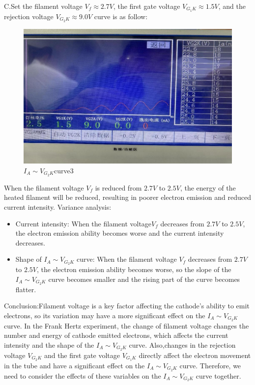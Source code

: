 \documentclass[UTF8]{article}
\begin{document}
C.Set the filament voltage $V_f\approx 2.7V$, the first gate voltage $V_{G_1K}\approx 1.5V$, and the rejection voltage $V_{G_2K}\approx 9.0V$ curve is as follow:
\begin{figure}[H]
            	\centering
            	\includegraphics[clip,scale=0.8,trim={0 0 0 0}]{fig/fig13.png}
            	\caption{$I_A\sim V_{G_2K}$curve3}
            	\label{figure.13}
\end{figure}
When the filament voltage $V_f$ is reduced from $2.7 V$ to $2.5 V$, the energy of the heated filament will be reduced, resulting in poorer electron emission and reduced current intensity. Variance analysis:

\begin{itemize}
\item Current intensity: When the filament voltage$V_f$ decreases from $2.7V$ to $2.5V$, the electron emission ability becomes worse and the current intensity decreases.
\item Shape of $I_A\sim V_{G_2K}$ curve: When the filament voltage $V_f$ decreases from $2.7V$ to $2.5V$, the electron emission ability becomes worse, so the slope of the $I_A\sim V_{G_2K}$ curve becomes smaller and the rising part of the curve becomes flatter.
\end{itemize}

Conclusion:Filament voltage is a key factor affecting the cathode's ability to emit electrons, so its variation may have a more significant effect on the $I_A\sim V_{G_2K}$ curve. In the Frank Hertz experiment, the change of filament voltage changes the number and energy of cathode emitted electrons, which affects the current intensity and the shape of the $I_A\sim V_{G_2K}$ curve. Also,changes in the rejection voltage $V_{G_2K}$ and the first gate voltage $V_{G_1K}$ directly affect the electron movement in the tube and have a significant effect on the $I_A\sim V_{G_2K}$ curve. Therefore, we need to consider the effects of these variables on the $I_A\sim V_{G_2K}$ curve together.
\end{document}
